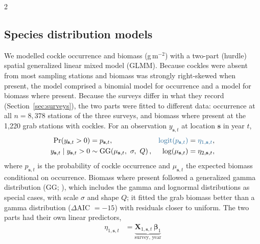 \begin{spacing}{2}
\subsection{Species distribution models}
\label{sec:sdm}
We modelled cockle occurrence and biomass (g\,m$^{-2}$) with a two-part (hurdle) spatial generalized linear mixed model (GLMM). Because cockles were absent from most sampling stations and biomass was strongly right-skewed when present, the model comprised a binomial model for occurrence and a model for biomass where present. Because the surveys differ in what they record (Section~\ref{sec:surveys}), the two parts were fitted to different data: occurrence at all $n = 8{,}378$ stations of the three surveys, and biomass where present at the 1{,}220 grab stations with cockles. For an observation $y_{\mathbf{s},t}$ at location $\mathbf{s}$ in year $t$,
\begin{align}
\Pr(y_{\mathbf{s},t} > 0) &= p_{\mathbf{s},t}, &
\rev{\operatorname{logit}(p_{\mathbf{s},t})} &= \rev{\eta_{1,\mathbf{s},t}},\\
y_{\mathbf{s},t} \mid y_{\mathbf{s},t} > 0 &\sim \operatorname{GG}\!\left(\mu_{\mathbf{s},t},\ \sigma,\ Q\right), &
\log(\mu_{\mathbf{s},t}) &= \eta_{2,\mathbf{s},t},
\end{align}
where $p_{\mathbf{s},t}$ is the probability of cockle occurrence and $\mu_{\mathbf{s},t}$ the expected biomass conditional on occurrence.  Biomass where present followed a generalized gamma distribution (GG; \citet{prenticeLogGammaModel1974, dunicGeneralizedGammaFlexible2025}), which includes the gamma and lognormal distributions as special cases, with scale $\sigma$ and shape $Q$; it fitted the grab biomass better than a gamma distribution ($\Delta$AIC $=-15$) with residuals closer to uniform. The two parts had their own linear predictors,
\begin{align}
\eta_{1,\mathbf{s},t} &=
\underbrace{\mathbf{X}_{1,\mathbf{s},t}\,\boldsymbol{\beta}_1}_{\text{survey, year}}

\end{align}
\end{spacing}

